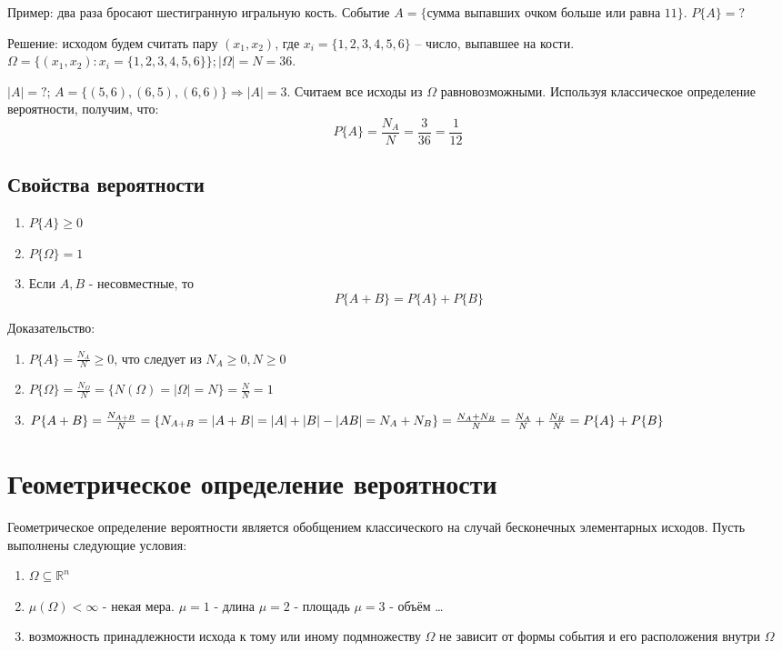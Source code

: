 \documentclass[a4paper, 12pt]{report}
\begin{document}
		Пример: два раза бросают шестигранную игральную кость. Событие $A=\{\text{сумма выпавших очком больше или равна 11}\}$. $P\{A\}=?$
		
		Решение: исходом будем считать пару $(x_1,x_2)$, где $x_i=\{1,2,3,4,5,6\}$ -- число, выпавшее на кости. $\Omega=\{(x_1,x_2): x_i=\{1,2,3,4,5,6\}\}; |\Omega|=N=36$.
		
		$|A|=?$; $A=\{(5, 6), (6, 5), (6, 6)\}\Rightarrow|A|=3$. Считаем все исходы из $\Omega$ равновозможными. Используя классическое определение вероятности, получим, что:
		\begin{equation}
			P\{A\}=\frac{N_A}{N}=\frac{3}{36}=\frac{1}{12}
		\end{equation}
	
		\subsection{Свойства вероятности}
			\begin{enumerate}
				\item $P\{A\}\ge0$
				\item $P\{\Omega\}=1$
				\item Если $A, B$ - несовместные, то
				\begin{equation}
					P\{A+B\}=P\{A\}+P\{B\}
				\end{equation}
			\end{enumerate}
		
			Доказательство:
			\begin{enumerate}
				\item $P\{A\}=\frac{N_A}{N}\ge0$, что следует из $N_A\ge0, N\ge0$
				\item $P\{\Omega\}=\frac{N_\Omega}{N}=\{N(\Omega)=|\Omega|=N\}=\frac{N}{N}=1$
				\item $P\{A+B\}=\frac{N_{A+B}}{N} \\
				=\{N_{A+B}=|A+B|=|A|+|B|-|AB|=N_A+N_B\} \\
				=\frac{N_A+N_B}{N}=\frac{N_A}{N}+\frac{N_B}{N}=P\{A\}+P\{B\}$
			\end{enumerate}

	\section{Геометрическое определение вероятности}
		Геометрическое определение вероятности является обобщением классического на случай бесконечных элементарных исходов. Пусть выполнены следующие условия:
		\begin{enumerate}
			\item $\Omega\subseteq\mathbb{R}^n$
			\item $\mu(\Omega)<\infty$ - некая мера. 
				\subitem $\mu=1$ - длина
				\subitem $\mu=2$ - площадь
				\subitem $\mu=3$ - объём
				\subitem \dots
			\item возможность принадлежности исхода к тому или иному подмножеству $\Omega$ не зависит от формы события и его расположения внутри $\Omega$
		\end{enumerate}
	
\end{document}
